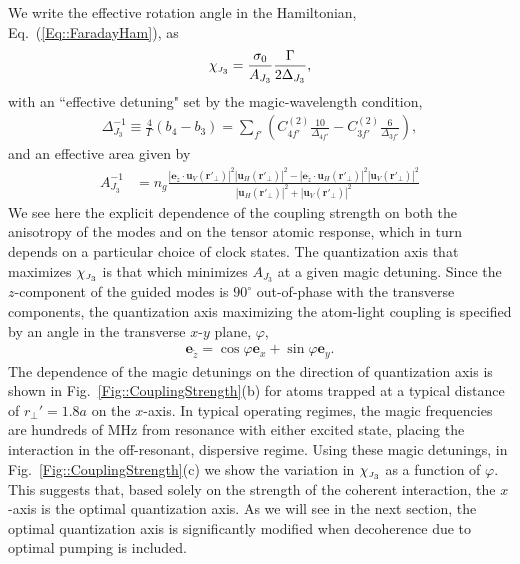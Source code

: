\documentclass[preprint, aps,pra,onecolumn]{revtex4-1} %
\def\br{\mathbf{r}}
\newcommand{\erf}[1]{Eq.~(\ref{#1})}
\newcommand{\frf}[1]{Fig.~\ref{#1}}
\newcommand{\mbf}[1]{\mathbf{#1}}
\newcommand{\qaxis}{\mathbf{e}_{\tilde{z}}}
\newcommand{\chieff}{\chi_{\raisebox{-.1pt}{\tiny $J_3$}}}
\begin{document}
We write the effective rotation angle in the Hamiltonian, \erf{Eq::FaradayHam}, as
	\begin{align} \label{Eq::chieff}
		\chieff = \frac{\sigma_0}{A_{J_3}} \frac{\Gamma}{ 2 \Delta_{J_3}},
	\end{align}
with an ``effective detuning" set by the magic-wavelength condition,
	\begin{align} \label{Eq::SqueezingEffectiveDetuning}
		 \Delta_{J_3}^{-1} \equiv \frac{4}{\Gamma} (b_4 - b_3) =   \sum_{f'}  \left( C^{(2)}_{4f'}\frac{10}{\Delta_{4f'}} -  C^{(2)}_{3f'}\frac{6}{ \Delta_{3f'} } \right),
	\end{align}
and an effective area given by
	\begin{align} \label{Eq::SqueezingModeArea}
		A_{J_3}^{-1} & = n_g \frac{ |\mathbf{e}_{\tilde{z}} \cdot \mathbf{u}_V(\br'_\perp)|^2 |\mathbf{u}_H(\br'_\perp)|^2 - |\mathbf{e}_{\tilde{z}} \cdot \mathbf{u}_H(\br'_\perp) |^2 |\mathbf{u}_V(\br'_\perp)|^2 }{ |\mathbf{u}_H(\br'_\perp)|^2 + |\mathbf{u}_V(\br'_\perp)|^2 } 
	\end{align}	
We see here the explicit dependence of the coupling strength on both the anisotropy of the modes and on the tensor atomic response, which in turn depends on a particular choice of clock states.  The quantization axis that maximizes $\chieff$ is that which minimizes $A_{J_3}$ at a given magic detuning.  
Since the $z$-component of the guided modes is $90^\circ$ out-of-phase with the transverse components, the quantization axis maximizing the atom-light coupling is specified by an angle in the transverse $x$-$y$ plane, $\varphi$,
	\begin{align} \label{Eq::QuantizationAxis}
		\qaxis = \cos \varphi \mbf{e}_x + \sin \varphi \mbf{e}_y.
	\end{align}
The dependence of the magic detunings on the direction of quantization axis is shown in \frf{Fig::CouplingStrength}(b) for atoms trapped at a typical distance of $r_\perp'=1.8a$ on the $x$-axis.   
In typical operating regimes, the magic frequencies are hundreds of MHz from resonance with either excited state, placing the interaction in the off-resonant, dispersive regime.  
Using these magic detunings, in \frf{Fig::CouplingStrength}(c) we show the variation in $\chieff$ as a function of $\varphi$.  
This suggests that, based solely on the strength of the coherent interaction, the $x$-axis is the optimal quantization axis. 
As we will see in the next section, the optimal quantization axis is significantly modified when decoherence due to optimal pumping is included.
\end{document}
